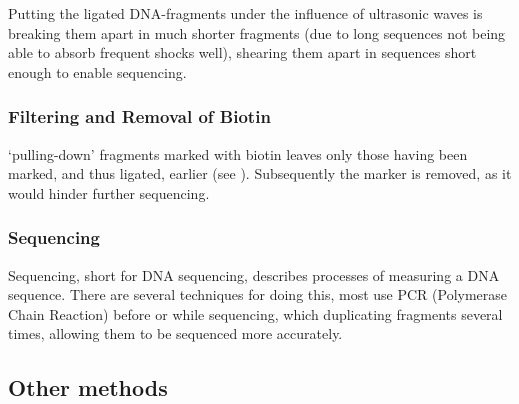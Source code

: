 Putting the ligated DNA-fragments under the influence of ultrasonic waves is
breaking them apart in much shorter fragments (due to long sequences not being
able to absorb frequent shocks well), shearing them apart in sequences short
enough to enable sequencing.


\subsubsection{Filtering and Removal of Biotin}\label{sec:pulldown}

`pulling-down' fragments marked with biotin leaves only those having been
marked, and thus ligated, earlier (see ). Subsequently the
marker is removed, as it would hinder further sequencing.

\subsubsection{Sequencing}\label{sec:sequencing}

Sequencing, short for DNA sequencing, describes processes of measuring a DNA
sequence. There are several techniques for doing this, most use PCR (Polymerase
Chain Reaction) before or while sequencing, which duplicating fragments
several times, allowing them to be sequenced more accurately.







\subsection{Other methods}\label{sec:other3c}


